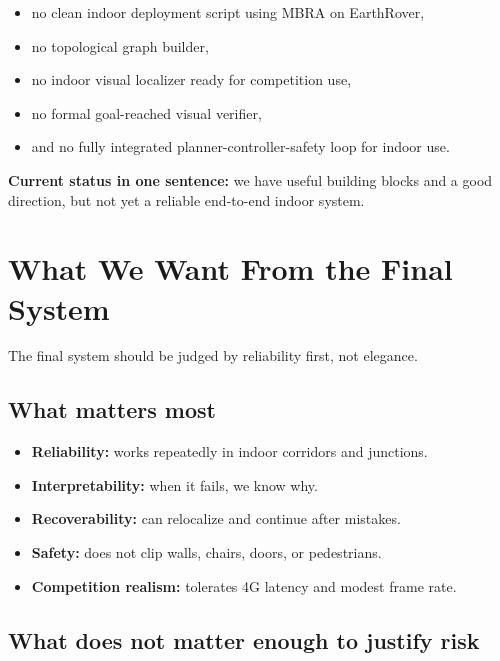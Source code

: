 \documentclass[11pt,a4paper]{article}
\begin{document}
\begin{itemize}[nosep]
  \item no clean indoor deployment script using MBRA on EarthRover,
  \item no topological graph builder,
  \item no indoor visual localizer ready for competition use,
  \item no formal goal-reached visual verifier,
  \item and no fully integrated planner-controller-safety loop for indoor use.
\end{itemize}

\begin{mdframed}
\textbf{Current status in one sentence:} we have useful building blocks and a
good direction, but not yet a reliable end-to-end indoor system.
\end{mdframed}


\section{What We Want From the Final System}

The final system should be judged by reliability first, not elegance.

\subsection{What matters most}

\begin{itemize}[nosep]
  \item \textbf{Reliability:} works repeatedly in indoor corridors and junctions.
  \item \textbf{Interpretability:} when it fails, we know why.
  \item \textbf{Recoverability:} can relocalize and continue after mistakes.
  \item \textbf{Safety:} does not clip walls, chairs, doors, or pedestrians.
  \item \textbf{Competition realism:} tolerates 4G latency and modest frame rate.
\end{itemize}

\subsection{What does not matter enough to justify risk}
\end{document}
